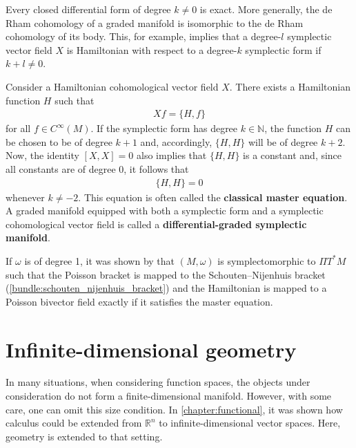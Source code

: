     \begin{property}\label{hdg:global_exactness}
        Every closed differential form of degree $k\neq0$ is exact. More generally, the de Rham cohomology of a graded manifold is isomorphic to the de Rham cohomology of its body. This, for example, implies that a degree-$l$ symplectic vector field $X$ is Hamiltonian with respect to a degree-$k$ symplectic form if $k+l\neq0$.
    \end{property}
    \begin{result}\label{hdg:dg_symplectic_manifold}
        Consider a Hamiltonian cohomological vector field $X$. There exists a Hamiltonian function $H$ such that
        \begin{gather}
            Xf = \{H,f\}
        \end{gather}
        for all $f\in C^\infty(M)$. If the symplectic form has degree $k\in\mathbb{N}$, the function $H$ can be chosen to be of degree $k+1$ and, accordingly, $\{H,H\}$ will be of degree $k+2$. Now, the identity $[X,X] = 0$ also implies that $\{H,H\}$ is a constant and, since all constants are of degree 0, it follows that
        \begin{gather}
            \label{hdg:classical_master_equation}
            \{H,H\}=0
        \end{gather}
        whenever $k\neq-2$. This equation is often called the \textbf{classical master equation}. A graded manifold equipped with both a symplectic form and a symplectic cohomological vector field is called a \textbf{differential-graded symplectic manifold}.

        If $\omega$ is of degree 1, it was shown by  that $(M,\omega)$ is symplectomorphic to $\Pi T^*M$ such that the Poisson bracket is mapped to the Schouten--Nijenhuis bracket (\cref{bundle:schouten_nijenhuis_bracket}) and the Hamiltonian is mapped to a Poisson bivector field exactly if it satisfies the master equation.
    \end{result}

\section{Infinite-dimensional geometry}\label{section:infinite_dimensional}

    In many situations, when considering function spaces, the objects under consideration do not form a finite-dimensional manifold. However, with some care, one can omit this size condition. In \cref{chapter:functional}, it was shown how calculus could be extended from $\mathbb{R}^n$ to infinite-dimensional vector spaces. Here, geometry is extended to that setting.

